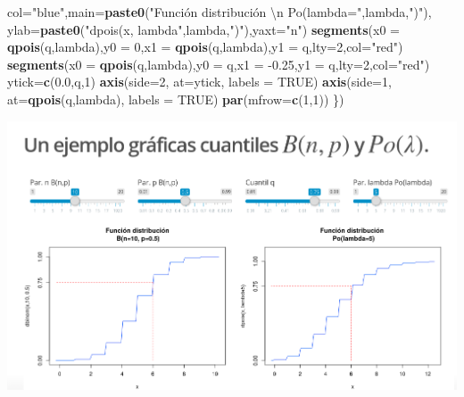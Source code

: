 \documentclass[]{book}
\newenvironment{Shaded}{\begin{snugshade}}{\end{snugshade}}
\newcommand{\CharTok}[1]{\textcolor[rgb]{0.31,0.60,0.02}{#1}}
\newcommand{\DataTypeTok}[1]{\textcolor[rgb]{0.13,0.29,0.53}{#1}}
\newcommand{\DecValTok}[1]{\textcolor[rgb]{0.00,0.00,0.81}{#1}}
\newcommand{\FloatTok}[1]{\textcolor[rgb]{0.00,0.00,0.81}{#1}}
\newcommand{\KeywordTok}[1]{\textcolor[rgb]{0.13,0.29,0.53}{\textbf{#1}}}
\newcommand{\NormalTok}[1]{#1}
\newcommand{\OtherTok}[1]{\textcolor[rgb]{0.56,0.35,0.01}{#1}}
\newcommand{\StringTok}[1]{\textcolor[rgb]{0.31,0.60,0.02}{#1}}
\begin{document}
\begin{Shaded}
\begin{Highlighting}[]
        \DataTypeTok{col=}\StringTok{"blue"}\NormalTok{,}\DataTypeTok{main=}\KeywordTok{paste0}\NormalTok{(}\StringTok{"Función distribución }\CharTok{\textbackslash{}n}\StringTok{ Po(lambda="}\NormalTok{,lambda,}\StringTok{")"}\NormalTok{),}
        \DataTypeTok{ylab=}\KeywordTok{paste0}\NormalTok{(}\StringTok{"dpois(x, lambda"}\NormalTok{,lambda,}\StringTok{")"}\NormalTok{),}\DataTypeTok{yaxt=}\StringTok{"n"}\NormalTok{)}
  \KeywordTok{segments}\NormalTok{(}\DataTypeTok{x0 =} \KeywordTok{qpois}\NormalTok{(q,lambda),}\DataTypeTok{y0 =} \DecValTok{0}\NormalTok{,}\DataTypeTok{x1 =} \KeywordTok{qpois}\NormalTok{(q,lambda),}\DataTypeTok{y1 =}\NormalTok{ q,}\DataTypeTok{lty=}\DecValTok{2}\NormalTok{,}\DataTypeTok{col=}\StringTok{"red"}\NormalTok{)}
  \KeywordTok{segments}\NormalTok{(}\DataTypeTok{x0 =} \KeywordTok{qpois}\NormalTok{(q,lambda),}\DataTypeTok{y0 =}\NormalTok{ q,}\DataTypeTok{x1 =} \FloatTok{-0.25}\NormalTok{,}\DataTypeTok{y1 =}\NormalTok{ q,}\DataTypeTok{lty=}\DecValTok{2}\NormalTok{,}\DataTypeTok{col=}\StringTok{"red"}\NormalTok{)}
\NormalTok{  ytick=}\KeywordTok{c}\NormalTok{(}\FloatTok{0.0}\NormalTok{,q,}\DecValTok{1}\NormalTok{)}
  \KeywordTok{axis}\NormalTok{(}\DataTypeTok{side=}\DecValTok{2}\NormalTok{, }\DataTypeTok{at=}\NormalTok{ytick, }\DataTypeTok{labels =} \OtherTok{TRUE}\NormalTok{)}
  \KeywordTok{axis}\NormalTok{(}\DataTypeTok{side=}\DecValTok{1}\NormalTok{, }\DataTypeTok{at=}\KeywordTok{qpois}\NormalTok{(q,lambda), }\DataTypeTok{labels =} \OtherTok{TRUE}\NormalTok{)}
  \KeywordTok{par}\NormalTok{(}\DataTypeTok{mfrow=}\KeywordTok{c}\NormalTok{(}\DecValTok{1}\NormalTok{,}\DecValTok{1}\NormalTok{))}
\NormalTok{\})}
\end{Highlighting}
\end{Shaded}

\href{https://github.com/joanby/probabilidad}{\includegraphics{Images/noshinyImages/interactiva_cuantiles1.png}}
\end{document}
